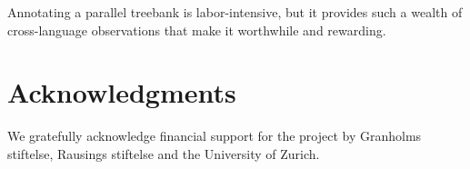 \documentclass[output=paper]{LSP/langsci}
\begin{document}
Annotating a parallel treebank is labor-intensive, but it provides such a wealth of cross-language observations that make it worthwhile and rewarding. 

\section*{Acknowledgments}\label{sec:volk:5}

We gratefully acknowledge financial support for the  project by Granholms stiftelse, Rausings stiftelse and the University of Zurich.

{\sloppy 
\printbibliography[heading=subbibliography,notkeyword=this]
}
\end{document}
